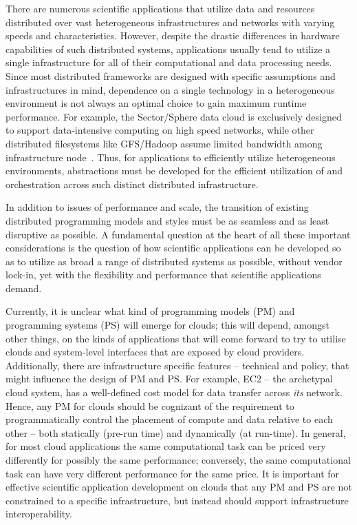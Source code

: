 \documentclass[3p,twocolumn]{elsarticle}
\begin{document}
There are numerous scientific applications that utilize data and
resources distributed over vast heterogeneous infrastructures and
networks with varying speeds and characteristics. However, despite the
drastic differences in hardware capabilities of such distributed
systems, applications usually tend to utilize a single infrastructure
for all of their computational and data processing needs. Since most
distributed frameworks are designed with specific assumptions and
infrastructures in mind, dependence on a single technology in a
heterogeneous environment is not always an optimal choice to gain
maximum runtime performance. For example, the Sector/Sphere data cloud
is exclusively designed to support data-intensive computing on high
speed networks, while other distributed filesystems like GFS/Hadoop
assume limited bandwidth among infrastructure node~\cite{GFS}. Thus,
for applications to efficiently utilize heterogeneous environments,
abstractions must be developed for the efficient utilization of and
orchestration across such distinct distributed infrastructure. 

In addition to issues of performance and scale, the transition of
existing distributed programming models and styles must be as
seamless and as least disruptive as possible.  A fundamental question
at the heart of all these important considerations is the question of
how scientific applications can be developed so as to utilize as broad
a range of distributed systems as possible, without vendor lock-in,
yet with the flexibility and performance that scientific applications
demand.

Currently, it is unclear what kind of programming models (PM) and
programming systems (PS) will emerge for clouds; this will depend,
amongst other things, on the kinds of applications that will come
forward to try to utilise clouds and system-level interfaces that are
exposed by cloud providers.  Additionally, there are infrastructure
specific features -- technical and policy, that might influence the
design of PM and PS. For example, EC2 -- the archetypal cloud system,
has a well-defined cost model for data transfer across {\it its}
network. Hence, any PM for clouds should be cognizant of the
requirement to programmatically control the placement of compute and
data relative to each other -- both statically (pre-run time) and
dynamically (at run-time).  In general, for most cloud applications
the same computational task can be priced very differently for
possibly the same performance; conversely, the same computational task
can have very different performance for the same price. It is
important for effective scientific application development on clouds
that any PM and PS are not constrained to a specific infrastructure,
but instead should support infrastructure interoperability.  
\end{document}
